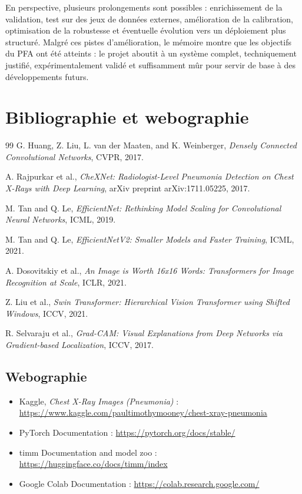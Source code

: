 \documentclass[a4paper,11pt,oneside]{report}
\begin{document}
En perspective, plusieurs prolongements sont possibles : enrichissement de la validation, test sur des jeux de données externes, amélioration de la calibration, optimisation de la robustesse et éventuelle évolution vers un déploiement plus structuré. Malgré ces pistes d'amélioration, le mémoire montre que les objectifs du PFA ont été atteints : le projet aboutit à un système complet, techniquement justifié, expérimentalement validé et suffisamment mûr pour servir de base à des développements futurs.

\chapter*{Bibliographie et webographie}
\begin{thebibliography}{99}
G. Huang, Z. Liu, L. van der Maaten, and K. Weinberger,
\textit{Densely Connected Convolutional Networks},
CVPR, 2017.

A. Rajpurkar et al.,
\textit{CheXNet: Radiologist-Level Pneumonia Detection on Chest X-Rays with Deep Learning},
arXiv preprint arXiv:1711.05225, 2017.

M. Tan and Q. Le,
\textit{EfficientNet: Rethinking Model Scaling for Convolutional Neural Networks},
ICML, 2019.

M. Tan and Q. Le,
\textit{EfficientNetV2: Smaller Models and Faster Training},
ICML, 2021.

A. Dosovitskiy et al.,
\textit{An Image is Worth 16x16 Words: Transformers for Image Recognition at Scale},
ICLR, 2021.

Z. Liu et al.,
\textit{Swin Transformer: Hierarchical Vision Transformer using Shifted Windows},
ICCV, 2021.

R. Selvaraju et al.,
\textit{Grad-CAM: Visual Explanations from Deep Networks via Gradient-based Localization},
ICCV, 2017.
\end{thebibliography}

\section*{Webographie}
\begin{itemize}
\item Kaggle, \textit{Chest X-Ray Images (Pneumonia)} : \url{https://www.kaggle.com/paultimothymooney/chest-xray-pneumonia}
\item PyTorch Documentation : \url{https://pytorch.org/docs/stable/}
\item timm Documentation and model zoo : \url{https://huggingface.co/docs/timm/index}
\item Google Colab Documentation : \url{https://colab.research.google.com/}
\end{itemize}
\end{document}
